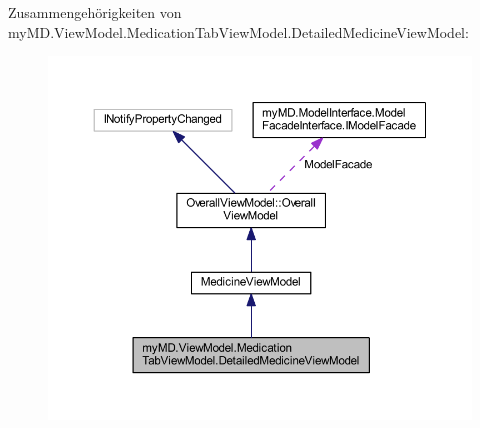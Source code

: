 Zusammengehörigkeiten von my\+M\+D.\+View\+Model.\+Medication\+Tab\+View\+Model.\+Detailed\+Medicine\+View\+Model\+:\nopagebreak
\begin{figure}[H]
\begin{center}
\leavevmode
\includegraphics[width=350pt]{classmy_m_d_1_1_view_model_1_1_medication_tab_view_model_1_1_detailed_medicine_view_model__coll__graph}
\end{center}
\end{figure}
